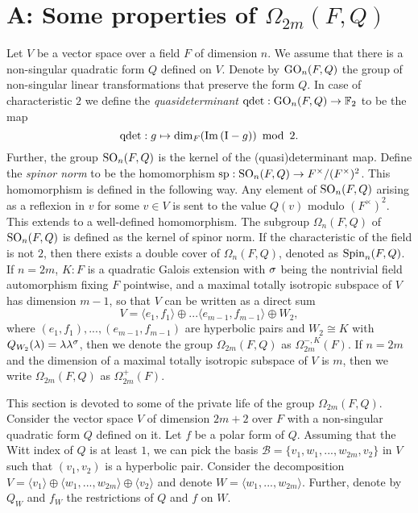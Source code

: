 \chapter{A: Some properties of $\Omega_{2m}(F,Q)$}
\label{AppA}

Let $V$ be a vector space over a field $F$ of dimension $n$. We assume that there is a 
non-singular quadratic form $Q$ defined on $V$. Denote by $\mathrm{GO}_n(F,Q)$ the group of 
non-singular linear transformations that preserve the
form $Q$. In case of characteristic $2$ we define the \textit{quasideterminant}
$\mathrm{qdet}:\mathrm{GO}_n(F,Q) \rightarrow \mathbb{F}_2$ to be the map
\begin{equation}
    \operatorname{qdet}: g \mapsto \dim_F ( \mathrm{Im}\,(\mathord{\mathrm{I}} - g) )\ \operatorname{mod}\ 2.
\end{equation}
Further, the group $\mathrm{SO}_n(F,Q)$ is the kernel of the (quasi)determinant map. Define the 
\textit{spinor norm} to be the homomorphism $\mathrm{sp} : \mathrm{SO}_n(F,Q) \rightarrow F^{\times} / 
(F^{\times})^2$. This homomorphism is defined in the following way. Any element of 
$\mathrm{SO}_n(F,Q)$ arising as a reflexion in $v$ for some $v \in V$ is sent to the value
$Q(v)$ modulo $(F^{\times})^2$. This extends to a well-defined homomorphism. The subgroup
$\Omega_n(F, Q)$ of $\mathrm{SO}_n(F,Q)$ is defined as the kernel of spinor norm. If the characteristic 
of the field is not $2$, then there exists a double cover of $\Omega_n(F,Q)$, denoted as
$\mathrm{Spin}_n(F,Q)$. If $n = 2m$, $K:F$ is a 
quadratic Galois extension with $\sigma$ being the
nontrivial field automorphism fixing $F$
pointwise, and a maximal
totally isotropic subspace of $V$ has dimension
$m-1$, so that $V$ can be written as a direct
sum
\begin{equation}
V = \langle e_1, f_1 \rangle \oplus ...
\langle e_{m-1}, f_{m-1} \rangle \oplus 
W_2,	
\end{equation}
where $(e_1,f_1),...,(e_{m-1},f_{m-1})$ are
hyperbolic pairs and $W_2 \cong K$ with 
$Q_{W_2}(\lambda) = \lambda \lambda^{\sigma}$,
then we denote the group $\Omega_{2m}(F,Q)$
as $\Omega_{2m}^{-,K}(F)$. If $n = 2m$ and 
the dimension of a maximal totally isotropic 
subspace of $V$ is $m$, then we write
$\Omega_{2m}(F,Q)$ as $\Omega_{2m}^+(F)$.

This section is devoted to some of the private life of the group $\Omega_{2m}(F,Q)$.
Consider the vector space $V$ of dimension
$2m+2$ over $F$ with a non-singular quadratic form $Q$ defined on it. 
Let $f$ be a polar form of $Q$. 
Assuming that the Witt index of $Q$ is at least $1$, we can pick 
the basis $\mathcal{B} = \{v_1, w_1,...,w_{2m}, v_2\}$ in $V$ such that $(v_1,v_2)$ 
is a hyperbolic pair. Consider the decomposition $V = \langle v_1 \rangle \oplus
\langle w_1, ..., w_{2m} \rangle \oplus \langle v_2 \rangle$ and denote 
$W = \langle w_1, ..., w_{2m} \rangle$. Further, denote by $Q_W$ and $f_W$ the restrictions of 
$Q$ and $f$ on $W$.

